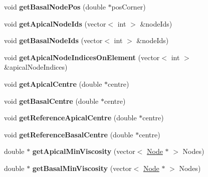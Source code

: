 \begin{DoxyCompactItemize}
\item 
\hypertarget{classPrism_a31324d23b37fa20911916ebb7ee1064d}{}void {\bfseries get\+Basal\+Node\+Pos} (double $\ast$pos\+Corner)\label{classPrism_a31324d23b37fa20911916ebb7ee1064d}

\item 
\hypertarget{classPrism_a183639a3a651e9d2ab4b15993c21fe59}{}void {\bfseries get\+Apical\+Node\+Ids} (vector$<$ int $>$ \&node\+Ids)\label{classPrism_a183639a3a651e9d2ab4b15993c21fe59}

\item 
\hypertarget{classPrism_aadad90b16d4ca631423ed440bc6a60f6}{}void {\bfseries get\+Basal\+Node\+Ids} (vector$<$ int $>$ \&node\+Ids)\label{classPrism_aadad90b16d4ca631423ed440bc6a60f6}

\item 
\hypertarget{classPrism_af1d4aacb691703fe0d323565d8a00322}{}void {\bfseries get\+Apical\+Node\+Indices\+On\+Element} (vector$<$ int $>$ \&apical\+Node\+Indices)\label{classPrism_af1d4aacb691703fe0d323565d8a00322}

\item 
\hypertarget{classPrism_a66271876c729c19efc54075420a6ea0e}{}void {\bfseries get\+Apical\+Centre} (double $\ast$centre)\label{classPrism_a66271876c729c19efc54075420a6ea0e}

\item 
\hypertarget{classPrism_a65e3e5e85c847579e1929b57ba5374b6}{}void {\bfseries get\+Basal\+Centre} (double $\ast$centre)\label{classPrism_a65e3e5e85c847579e1929b57ba5374b6}

\item 
\hypertarget{classPrism_a151f66d1f21ce8db435c6b9cc08230ed}{}void {\bfseries get\+Reference\+Apical\+Centre} (double $\ast$centre)\label{classPrism_a151f66d1f21ce8db435c6b9cc08230ed}

\item 
\hypertarget{classPrism_a744d31f963b31bfc7f51194988cd4102}{}void {\bfseries get\+Reference\+Basal\+Centre} (double $\ast$centre)\label{classPrism_a744d31f963b31bfc7f51194988cd4102}

\item 
\hypertarget{classPrism_a5b036f4495154c79c0ed36f697faae6e}{}double $\ast$ {\bfseries get\+Apical\+Min\+Viscosity} (vector$<$ \hyperlink{classNode}{Node} $\ast$ $>$ Nodes)\label{classPrism_a5b036f4495154c79c0ed36f697faae6e}

\item 
\hypertarget{classPrism_ad3568f0b36ce18cb87d5e9957f1dfd90}{}double $\ast$ {\bfseries get\+Basal\+Min\+Viscosity} (vector$<$ \hyperlink{classNode}{Node} $\ast$ $>$ Nodes)\label{classPrism_ad3568f0b36ce18cb87d5e9957f1dfd90}


\end{DoxyCompactItemize}
